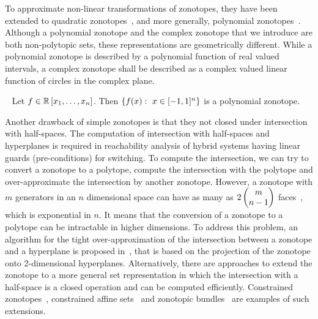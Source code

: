 To approximate non-linear transformations of zonotopes, they have been
extended to quadratic zonotopes~\cite{DBLP:conf/aplas/AdjeGW15}, and
more generally, polynomial
zonotopes~\cite{DBLP:conf/hybrid/Althoff13}.  Although a polynomial
zonotope and the complex zonotope that we introduce are both
non-polytopic sets, these representations are geometrically
different.  While a polynomial zonotope is described by a polynomial function of
real valued intervals, a complex zonotope shall be described as a
complex valued linear function of circles in the complex plane.
%
\begin{definition}~\cite{DBLP:conf/hybrid/Althoff13}
Let $f\in\mathbb{R}\left[x_1,\ldots,x_n\right]$.  Then
$\left\{f(x):~x\in[-1,1]^n\right\}$ is a polynomial zonotope.
\end{definition}
%
Another drawback of simple zonotopes is that they not closed under
intersection with half-spaces.  The computation of intersection with
half-spaces and hyperplanes is required in reachability analysis of
hybrid systems having linear guards (pre-conditions) for switching.
To compute the intersection, we can try to convert a zonotope to a
polytope, compute the intersection with the polytope and
over-approximate the intersection by another zonotope.  However, a
zonotope with $m$ generators in an $n$ dimensional space can have as
many as $2\left(\begin{matrix}m\\n-1\end{matrix}\right)$
  faces~\cite{zaslavsky1975facing}, which is exponential in $n$.  It
  means that the conversion of a zonotope to a polytope can be
  intractable in higher dimensions.  To address this problem, an
  algorithm for the tight over-approximation of the intersection
  between a zonotope and a hyperplane is proposed
  in~\cite{girard2008zonotope}, that is based on the projection of the
  zonotope onto 2-dimensional hyperplanes.  Alternatively, there are approaches to extend
  the zonotope to a more general set representation in which the
  intersection with a half-space is a closed operation and can be
  computed efficiently.  Constrained
  zonotopes~\cite{scott2016constrained}, constrained affine
  sets~\cite{Ghorbal2010} and zonotopic
  bundles~\cite{althoff2011zonotope} are examples of such extensions.

